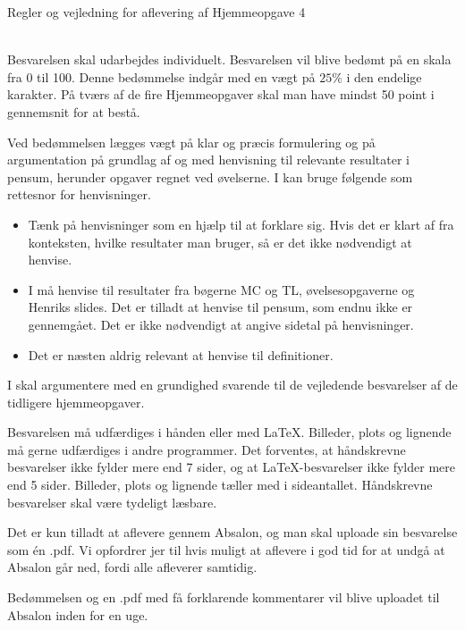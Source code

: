 \documentclass{article}
\begin{document}

\newpage
\noindent
{\LARGE Regler og vejledning for aflevering af Hjemmeopgave 4}

\noindent\hrulefill \\

\noindent
Besvarelsen skal udarbejdes individuelt. Besvarelsen vil blive bedømt på en skala fra 0 til 100. Denne bedømmelse indgår med en vægt på $25\%$ i den endelige karakter. På tværs af de fire Hjemmeopgaver skal man have mindst 50 point i gennemsnit for at bestå.

Ved bedømmelsen lægges vægt på klar og præcis formulering og på argumentation på grundlag af og med henvisning til relevante resultater i pensum, herunder opgaver regnet ved øvelserne. I kan bruge følgende som rettesnor for henvisninger.
\begin{itemize}
    \item Tænk på henvisninger som en hjælp til at forklare sig. Hvis det er klart af fra konteksten, hvilke resultater man bruger, så er det ikke nødvendigt at henvise.
    
    \item I må henvise til resultater fra bøgerne MC og TL, øvelsesopgaverne og Henriks slides. Det er tilladt at henvise til pensum, som endnu ikke er gennemgået. Det er ikke nødvendigt at angive sidetal på henvisninger. 
    
    \item Det er næsten aldrig relevant at henvise til definitioner.
\end{itemize}
I skal argumentere med en grundighed svarende til de vejledende besvarelser af de tidligere hjemmeopgaver.

\bigskip  
\noindent
Besvarelsen må udfærdiges i hånden eller med \LaTeX. Billeder, plots og lignende må gerne udfærdiges i andre programmer. Det forventes, at håndskrevne besvarelser ikke fylder mere end 7 sider,
og at \LaTeX-besvarelser ikke fylder mere end 5 sider. Billeder, plots og lignende tæller med i sideantallet. Håndskrevne besvarelser skal være tydeligt læsbare.

\bigskip 
\noindent
Det er kun tilladt at aflevere gennem Absalon, og man skal uploade sin besvarelse som én .pdf. Vi opfordrer jer til hvis muligt at aflevere i god tid for at undgå at Absalon går ned, fordi alle afleverer samtidig.

\bigskip
\noindent
Bedømmelsen og en .pdf med få forklarende kommentarer vil blive uploadet til Absalon inden for en uge.
\end{document}
